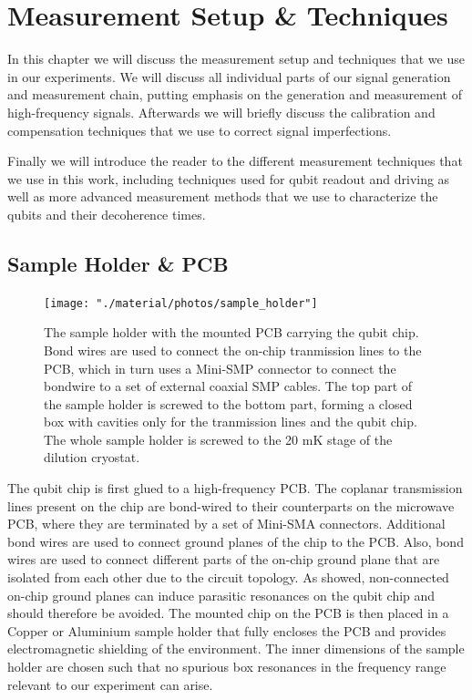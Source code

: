 \chapter{Measurement Setup \& Techniques}

In this chapter we will discuss the measurement setup and techniques that we use in our experiments. We will discuss all individual parts of our signal generation and measurement chain, putting emphasis on the generation and measurement of high-frequency signals. Afterwards we will briefly discuss the calibration and compensation techniques that we use to correct signal imperfections.

Finally we will introduce the reader to the different measurement techniques that we use in this work, including techniques used for qubit readout and driving as well as more advanced measurement methods that we use to characterize the qubits and their decoherence times.

\section{Sample Holder \& PCB}

\begin{figure}
	\centering
		\texttt{[image: "./material/photos/sample\_holder"]}
	\caption[]{The sample holder with the mounted PCB carrying the qubit chip. Bond wires are used to connect the on-chip tranmission lines to the PCB, which in turn uses a Mini-SMP connector to connect the bondwire to a set of external coaxial SMP cables. The top part of the sample holder is screwed to the bottom part, forming a closed box with cavities only for the tranmission lines and the qubit chip. The whole sample holder is screwed to the 20 mK stage of the dilution cryostat.}
	\label{fig:sample_holder_and_pcb}
\end{figure}

The qubit chip is first glued to a high-frequency PCB. The coplanar transmission lines present on the chip are bond-wired to their counterparts on the microwave PCB, where they are terminated by a set of Mini-SMA connectors. Additional bond wires are used to connect ground planes of the chip to the PCB. Also, bond wires are used to connect different parts of the on-chip ground plane that are isolated from each other due to the circuit topology. As \cite{schuster_circuit_2007} showed, non-connected on-chip ground planes can induce parasitic resonances on the qubit chip and should therefore be avoided. The mounted chip on the PCB is then placed in a Copper or Aluminium sample holder that fully encloses the PCB and provides electromagnetic shielding of the environment. The inner dimensions of the sample holder are chosen such that no spurious box resonances in the frequency range relevant to our experiment can arise.

